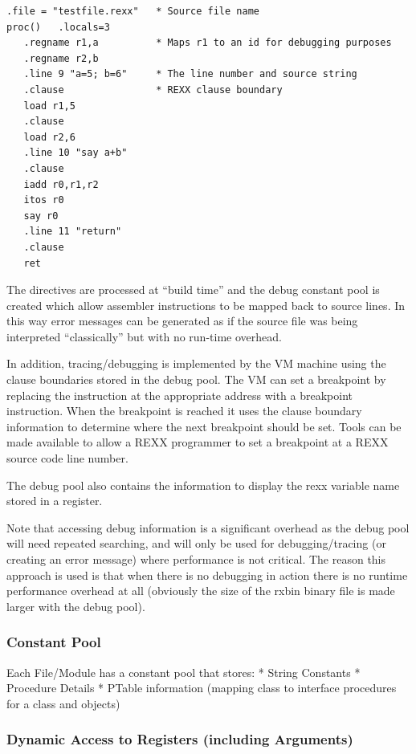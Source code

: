 \begin{verbatim}
.file = "testfile.rexx"   * Source file name 
proc()   .locals=3
   .regname r1,a          * Maps r1 to an id for debugging purposes 
   .regname r2,b
   .line 9 "a=5; b=6"     * The line number and source string
   .clause                * REXX clause boundary
   load r1,5
   .clause
   load r2,6
   .line 10 "say a+b"
   .clause
   iadd r0,r1,r2
   itos r0
   say r0
   .line 11 "return"
   .clause
   ret
\end{verbatim}

The directives are processed at ``build time'' and the debug constant
pool is created which allow assembler instructions to be mapped back to
source lines. In this way error messages can be generated as if the
source file was being interpreted ``classically'' but with no run-time
overhead.

In addition, tracing/debugging is implemented by the VM machine using
the clause boundaries stored in the debug pool. The VM can set a
breakpoint by replacing the instruction at the appropriate address with
a breakpoint instruction. When the breakpoint is reached it uses the
clause boundary information to determine where the next breakpoint
should be set. Tools can be made available to allow a REXX programmer to
set a breakpoint at a REXX source code line number.

The debug pool also contains the information to display the rexx
variable name stored in a register.

Note that accessing debug information is a significant overhead as the
debug pool will need repeated searching, and will only be used for
debugging/tracing (or creating an error message) where performance is
not critical. The reason this approach is used is that when there is no
debugging in action there is no runtime performance overhead at all
(obviously the size of the rxbin binary file is made larger with the
debug pool).

\hypertarget{constant-pool}{%
\subsubsection{Constant Pool}\label{constant-pool}}

Each File/Module has a constant pool that stores: * String Constants *
Procedure Details * PTable information (mapping class to interface
procedures for a class and objects)

\hypertarget{dynamic-access-to-registers-including-arguments}{%
\subsubsection{Dynamic Access to Registers (including
Arguments)}\label{dynamic-access-to-registers-including-arguments}}


